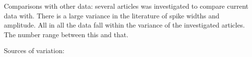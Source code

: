 \documentclass[altfont, fleqn]{uiophd}
\begin{document}
Comparisons with other data:
several articles was investigated to compare current data with.
There is a large variance in the literature of spike widths and amplitude. 
All in all the data fall within the variance of the investigated articles. 
The number range between this and that.


Sources of variation:






\begin{appendices}
\chapter{Appendix}
    \inputminted[
        breaklines=true,
        frame=lines,
        baselinestretch=0.4,
        fontsize=\footnotesize,
        bgcolor=LightGray,
        linenos
    ]{python}{examples/load_model.py}
\end{appendices}
\nocite{*}
\printbibliography[heading=bibintoc]
\end{document}
